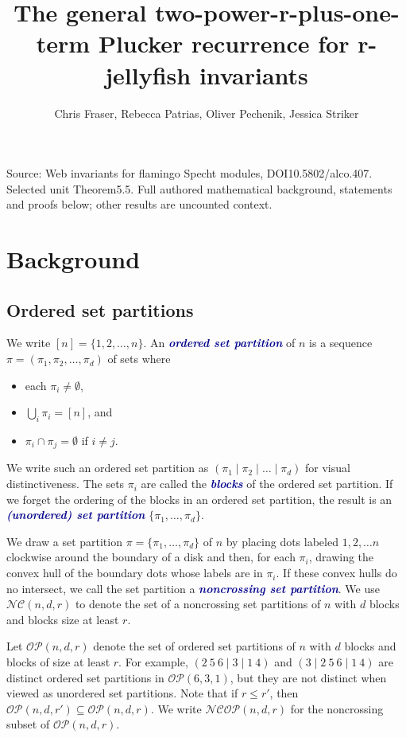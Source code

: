 \documentclass[10pt]{amsart}
\title[Human proof corpus 619]{The general two-power-r-plus-one-term Plucker recurrence for r-jellyfish invariants}
\author{Chris Fraser, Rebecca Patrias, Oliver Pechenik, Jessica Striker}
\theoremstyle{definition}
\theoremstyle{plain}
\theoremstyle{plain}
\theoremstyle{definition}
\theoremstyle{remark}
\theoremstyle{plain}
\theoremstyle{plain}
\theoremstyle{plain}
\numberwithin{equation}{section}
\newcommand{\nc}{\mathcal{NC}}
\newcommand{\ncop}{\mathcal{NCOP}}
\newcommand{\ordsetpart}{\mathcal{OP}}
\newcommand{\newword}[1]{\textcolor{darkblue}{\textbf{\emph{#1}}}}
\begin{document}
\maketitle
\noindent Source: Web invariants for flamingo Specht modules, DOI10.5802/alco.407. Selected unit Theorem5.5. Full authored mathematical background, statements and proofs below; other results are uncounted context.
\setcounter{section}{1}\setcounter{figure}{1}
\section{Background}\label{sec:background}
\subsection{Ordered set partitions}\label{sec:set_partitions}
We write $[n] = \{1, 2, \dots, n\}$. An \newword{ordered set partition} of $n$ is a sequence $\pi = (\pi_1, \pi_2, \dots, \pi_d)$ of sets where 
\begin{itemize}
    \item each $\pi_i \neq \emptyset$,
    \item $\bigcup_{i} \pi_i = [n]$, and
    \item $\pi_i \cap \pi_j = \emptyset$ if $i \neq j$.
\end{itemize}
We write such an ordered set partition as 
$(\pi_1 \mid \pi_2 \mid \dots \mid \pi_d)$ for visual distinctiveness. The sets $\pi_i$ are called the \newword{blocks} of the ordered set partition. If we forget the ordering of the blocks in an ordered set partition, the result is an \newword{(unordered) set partition} 
$\{\pi_1, \dots, \pi_d \}$. 


We draw a set partition $\pi = \{\pi_1, \dots, \pi_d \}$ of $n$ by placing dots labeled $1, 2, \dots n$ clockwise around the boundary of a disk and then, for each $\pi_i$, drawing the convex hull of the boundary dots whose labels are in $\pi_i$. If these convex hulls do no intersect, we call the set partition a \newword{noncrossing set partition}. We use $\nc(n,d,r)$ to denote the set of a noncrossing set partitions of $n$ with $d$ blocks and blocks size at least $r$.

Let $\ordsetpart(n,d,r)$ denote the set of ordered set partitions of $n$ with $d$ blocks and blocks of size at least $r$. For example, $(2~5~6\mid 3 \mid 1~4)$ and $(3\mid 2~5~6 \mid 1~4)$ are distinct ordered set partitions in $\ordsetpart(6,3,1)$, but they are not distinct when viewed as unordered set partitions. Note that if $r \leq r'$, then $\ordsetpart(n,d,r') \subseteq \ordsetpart(n,d,r)$. We write $\ncop(n,d,r)$ for the noncrossing subset of $\ordsetpart(n,d,r)$.
\end{document}
